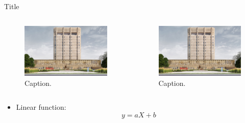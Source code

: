 \documentclass{beamer} %
\begin{document}
\begin{frame}{Title}
\begin{columns}[T]
    \begin{column}{.45\textwidth}
        \begin{figure}
        \centering
        \includegraphics[scale=0.05]{Figures/Brock-LINC-Project-South-Elevation.jpg}
        \caption{Caption.}
        \label{fig:label1}
        \end{figure}
    \end{column}
    \begin{column}{.48\textwidth}
        \begin{figure}
            \centering
            \includegraphics[scale=0.05]{Figures/Brock-LINC-Project-South-Elevation.jpg}
            \caption{Caption.}
            \label{fig:label2}
        \end{figure}
    \end{column}
\end{columns}

    \begin{itemize}
        \item Linear function: 
        \begin{equation}
            y=aX+b
        \end{equation}
    \end{itemize}
\end{frame}
\end{document}
